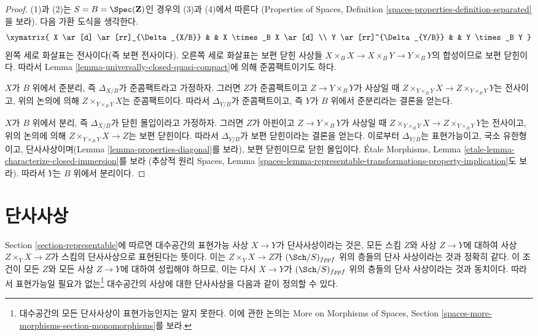 \begin{proof}
(1)과 (2)는 $S = B = \Spec(\mathbf{Z})$인 경우의 (3)과 (4)에서 따른다
(Properties of Spaces, Definition
\ref{spaces-properties-definition-separated}을 보라).
다음 가환 도식을 생각한다.
$$
\xymatrix{
X \ar[d] \ar[rr]_{\Delta_{X/B}} & & X \times_B X \ar[d] \\
Y \ar[rr]^{\Delta_{Y/B}} & & Y \times_B Y
}
$$
왼쪽 세로 화살표는 전사이다(즉 보편 전사이다).
오른쪽 세로 화살표는 보편 닫힌 사상들
$X \times_B X \to X \times_B Y \to Y \times_B Y$의 합성이므로
보편 닫힌이다. 따라서 Lemma
\ref{lemma-universally-closed-quasi-compact}에 의해 준콤팩트이기도 하다.

\medskip\noindent
$X$가 $B$ 위에서 준분리, 즉 $\Delta_{X/B}$가 준콤팩트라고 가정하자.
그러면 $Z$가 준콤팩트이고 $Z \to Y \times_B Y$가 사상일 때
$Z \times_{Y \times_B Y} X \to Z \times_{Y \times_B Y} Y$는 전사이고,
위의 논의에 의해 $Z \times_{Y \times_B Y} X$는 준콤팩트이다.
따라서 $\Delta_{Y/B}$가 준콤팩트이고, 즉 $Y$가 $B$ 위에서
준분리라는 결론을 얻는다.

\medskip\noindent
$X$가 $B$ 위에서 분리, 즉 $\Delta_{X/B}$가 닫힌 몰입이라고 가정하자.
그러면 $Z$가 아핀이고 $Z \to Y \times_B Y$가 사상일 때
$Z \times_{Y \times_B Y} X \to Z \times_{Y \times_B Y} Y$는 전사이고,
위의 논의에 의해 $Z \times_{Y \times_B Y} X \to Z$는 보편 닫힌이다.
따라서 $\Delta_{Y/B}$가 보편 닫힌이라는 결론을 얻는다.
이로부터 $\Delta_{Y/B}$는 표현가능이고, 국소 유한형이고,
단사사상이며(Lemma \ref{lemma-properties-diagonal}를 보라),
보편 닫힌이므로 닫힌 몰입이다. \'Etale Morphisms, Lemma
\ref{etale-lemma-characterize-closed-immersion}를 보라
(추상적 원리 Spaces, Lemma
\ref{spaces-lemma-representable-transformations-property-implication}도
보라). 따라서 $Y$는 $B$ 위에서 분리이다.
\end{proof}














\section{단사사상}
\label{section-monomorphisms}

\noindent
Section \ref{section-representable}에 따르면 대수공간의 표현가능 사상
$X \to Y$가 단사사상이라는 것은, 모든 스킴 $Z$와 사상 $Z \to Y$에
대하여 사상 $Z \times_Y X \to Z$가 스킴의 단사사상으로 표현된다는
뜻이다. 이는 $Z \times_Y X \to Z$가
$(\Sch/S)_{fppf}$ 위의 층들의 단사 사상이라는 것과 정확히 같다.
이 조건이 모든 $Z$와 모든 사상 $Z \to Y$에 대하여 성립해야 하므로,
이는 다시 $X \to Y$가 $(\Sch/S)_{fppf}$ 위의 층들의 단사 사상이라는
것과 동치이다. 따라서 표현가능일 필요가 없는\footnote{대수공간의 모든
단사사상이 표현가능인지는 알지 못한다. 이에 관한 논의는
More on Morphisms of Spaces, Section
\ref{spaces-more-morphisms-section-monomorphisms}를 보라.}
대수공간의 사상에 대한 단사사상을 다음과 같이 정의할 수 있다.

